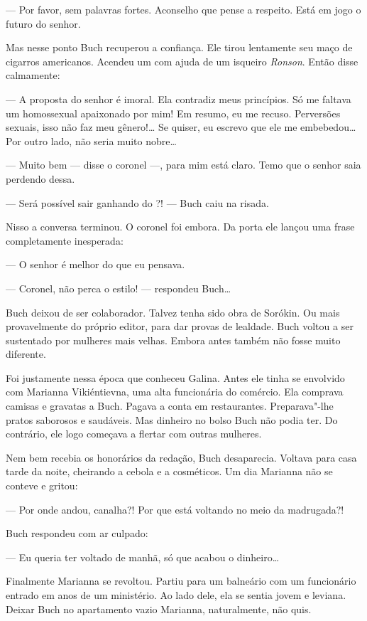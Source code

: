 --- Por favor, sem palavras fortes. Aconselho que pense a respeito. Está
em jogo o futuro do senhor.

Mas nesse ponto Buch recuperou a confiança. Ele tirou lentamente seu
maço de cigarros americanos. Acendeu um com ajuda de um isqueiro
\emph{Ronson}. Então disse calmamente:

--- A proposta do senhor é imoral. Ela contradiz meus princípios. Só me
faltava um homossexual apaixonado por mim! Em resumo, eu me recuso.
Perversões sexuais, isso não faz meu gênero!\ldots{} Se quiser, eu escrevo
que ele me embebedou\ldots{} Por outro lado, não seria muito nobre\ldots{}

--- Muito bem --- disse o coronel ---, para mim está claro. Temo que o
senhor saia perdendo dessa.

--- Será possível sair ganhando do ?! --- Buch caiu na risada.

Nisso a conversa terminou. O coronel foi embora. Da porta ele lançou uma
frase completamente inesperada:

--- O senhor é melhor do que eu pensava.

--- Coronel, não perca o estilo! --- respondeu Buch\ldots{}

\bigskip

Buch deixou de ser colaborador. Talvez tenha sido obra de Sorókin. Ou
mais provavelmente do próprio editor, para dar provas de lealdade. Buch
voltou a ser sustentado por mulheres mais velhas. Embora antes também
não fosse muito diferente.

Foi justamente nessa época que conheceu Galina. Antes ele tinha se
envolvido com Marianna Vikiéntievna, uma alta funcionária do comércio.
Ela comprava camisas e gravatas a Buch. Pagava a conta em restaurantes.
Preparava"-lhe pratos saborosos e saudáveis. Mas dinheiro no bolso Buch
não podia ter. Do contrário, ele logo começava a flertar com outras
mulheres.

Nem bem recebia os honorários da redação, Buch desaparecia. Voltava para
casa tarde da noite, cheirando a cebola e a cosméticos. Um dia Marianna
não se conteve e gritou:

--- Por onde andou, canalha?! Por que está voltando no meio da
madrugada?!

Buch respondeu com ar culpado:

--- Eu queria ter voltado de manhã, só que acabou o dinheiro\ldots{}

Finalmente Marianna se revoltou. Partiu para um balneário com um
funcionário entrado em anos de um ministério. Ao lado dele, ela se
sentia jovem e leviana. Deixar Buch no apartamento vazio Marianna,
naturalmente, não quis.

